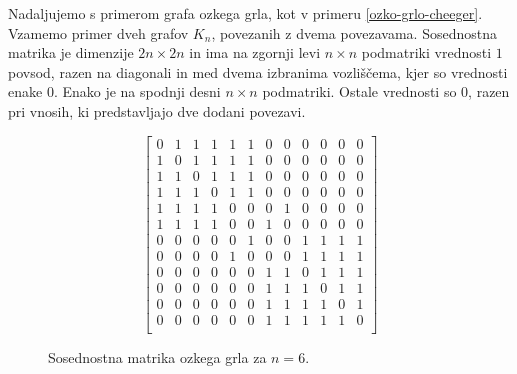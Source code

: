 \begin{primer}\label{ozko-grlo-lv}
    Nadaljujemo s primerom grafa ozkega grla, kot v primeru \ref{ozko-grlo-cheeger}. Vzamemo primer dveh grafov \(K_n\), povezanih z dvema povezavama. Sosednostna matrika je dimenzije \(2n \times 2n\) in ima na zgornji levi \(n\times n\) podmatriki vrednosti \(1\) povsod, razen na diagonali in med dvema izbranima vozliščema, kjer so vrednosti enake \(0\). Enako je na spodnji desni \(n\times n\) podmatriki. Ostale vrednosti so \(0\), razen pri vnosih, ki predstavljajo dve dodani povezavi.
\begin{figure}[H]
    \centering
    \[
        \begin{bmatrix}
            0 & 1 & 1 & 1 & 1 & 1 & 0 & 0 & 0 & 0 & 0 & 0 \\
            1 & 0 & 1 & 1 & 1 & 1 & 0 & 0 & 0 & 0 & 0 & 0 \\
            1 & 1 & 0 & 1 & 1 & 1 & 0 & 0 & 0 & 0 & 0 & 0 \\
            1 & 1 & 1 & 0 & 1 & 1 & 0 & 0 & 0 & 0 & 0 & 0 \\
            1 & 1 & 1 & 1 & 0 & 0 & 0 & 1 & 0 & 0 & 0 & 0 \\
            1 & 1 & 1 & 1 & 0 & 0 & 1 & 0 & 0 & 0 & 0 & 0 \\
            0 & 0 & 0 & 0 & 0 & 1 & 0 & 0 & 1 & 1 & 1 & 1 \\
            0 & 0 & 0 & 0 & 1 & 0 & 0 & 0 & 1 & 1 & 1 & 1 \\
            0 & 0 & 0 & 0 & 0 & 0 & 1 & 1 & 0 & 1 & 1 & 1 \\
            0 & 0 & 0 & 0 & 0 & 0 & 1 & 1 & 1 & 0 & 1 & 1 \\
            0 & 0 & 0 & 0 & 0 & 0 & 1 & 1 & 1 & 1 & 0 & 1 \\
            0 & 0 & 0 & 0 & 0 & 0 & 1 & 1 & 1 & 1 & 1 & 0 \\
        \end{bmatrix}
    \]
    \caption{Sosednostna matrika ozkega grla za \(n=6\).}
\end{figure}


\end{primer}
